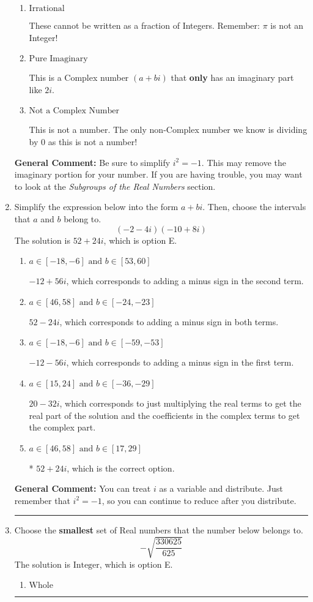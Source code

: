 \documentclass{extbook}[14pt]
\newcommand{\litem}[1]{\item #1

\rule{\textwidth}{0.4pt}}
\begin{document}
\begin{enumerate}
{\begin{enumerate}[label=\Alph*.]
* This is the correct option!
\item \( \text{Irrational} \)

These cannot be written as a fraction of Integers. Remember: $\pi$ is not an Integer!
\item \( \text{Pure Imaginary} \)

This is a Complex number $(a+bi)$ that \textbf{only} has an imaginary part like $2i$.
\item \( \text{Not a Complex Number} \)

This is not a number. The only non-Complex number we know is dividing by 0 as this is not a number!
\end{enumerate}

\textbf{General Comment:} Be sure to simplify $i^2 = -1$. This may remove the imaginary portion for your number. If you are having trouble, you may want to look at the \textit{Subgroups of the Real Numbers} section.
}
\litem{
Simplify the expression below into the form $a+bi$. Then, choose the intervals that $a$ and $b$ belong to.
\[ (-2 - 4 i)(-10 + 8 i) \]The solution is \( 52 + 24 i \), which is option E.\begin{enumerate}[label=\Alph*.]
\item \( a \in [-18, -6] \text{ and } b \in [53, 60] \)

 $-12 + 56 i$, which corresponds to adding a minus sign in the second term.
\item \( a \in [46, 58] \text{ and } b \in [-24, -23] \)

 $52 - 24 i$, which corresponds to adding a minus sign in both terms.
\item \( a \in [-18, -6] \text{ and } b \in [-59, -53] \)

 $-12 - 56 i$, which corresponds to adding a minus sign in the first term.
\item \( a \in [15, 24] \text{ and } b \in [-36, -29] \)

 $20 - 32 i$, which corresponds to just multiplying the real terms to get the real part of the solution and the coefficients in the complex terms to get the complex part.
\item \( a \in [46, 58] \text{ and } b \in [17, 29] \)

* $52 + 24 i$, which is the correct option.
\end{enumerate}

\textbf{General Comment:} You can treat $i$ as a variable and distribute. Just remember that $i^2=-1$, so you can continue to reduce after you distribute.
}
\litem{
Choose the \textbf{smallest} set of Real numbers that the number below belongs to.
\[ -\sqrt{\frac{330625}{625}} \]The solution is \( \text{Integer} \), which is option E.\begin{enumerate}[label=\Alph*.]
\item \( \text{Whole} \)


\end{enumerate}}
\end{enumerate}
\end{document}

